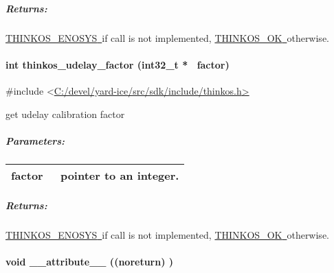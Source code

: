{\subparagraph{\texorpdfstring{{Returns:}}{Returns:}}\label{returns-52}

{\protect\hyperlink{h.3s49zyc}{THINKOS\_ENOSYS}}{\protect\hyperlink{h.3s49zyc}{~}}{if
call is not implemented,
}{\protect\hyperlink{h.2fk6b3p}{THINKOS\_OK}}{\protect\hyperlink{h.2fk6b3p}{~}}{otherwise.
}

\paragraph{\texorpdfstring{{int thinkos\_udelay\_factor (int32\_t *
~factor)}}{int thinkos\_udelay\_factor (int32\_t * ~factor)}}\label{int-thinkos_udelay_factor-int32_t-factor}

{}

{\#include
\textless{}}{\protect\hyperlink{h.pkwqa1}{C:/devel/yard-ice/src/sdk/include/thinkos.h}}{\protect\hyperlink{h.pkwqa1}{\textgreater{}}}

{get udelay calibration factor }

{}

\subparagraph{\texorpdfstring{{Parameters:}}{Parameters:}}\label{parameters-51}

\protect\hypertarget{t.ba04b86e0085018617d8457d329191a496a93af3}{}{}\protect\hypertarget{t.52}{}{}

\begin{longtable}[]{@{}ll@{}}
\toprule
\begin{minipage}[t]{0.47\columnwidth}\raggedright\strut
{factor}{~}\strut
\end{minipage} & \begin{minipage}[t]{0.47\columnwidth}\raggedright\strut
{pointer to an integer. }\strut
\end{minipage}\tabularnewline
\bottomrule
\end{longtable}

\subparagraph{\texorpdfstring{{Returns:}}{Returns:}}\label{returns-53}

{\protect\hyperlink{h.3s49zyc}{THINKOS\_ENOSYS}}{\protect\hyperlink{h.3s49zyc}{~}}{if
call is not implemented,
}{\protect\hyperlink{h.2fk6b3p}{THINKOS\_OK}}{\protect\hyperlink{h.2fk6b3p}{~}}{otherwise.
}

\paragraph{\texorpdfstring{{void \_\_attribute\_\_ ((noreturn)
)}}{void \_\_attribute\_\_ ((noreturn) )}}\label{void-__attribute__-noreturn}

}
